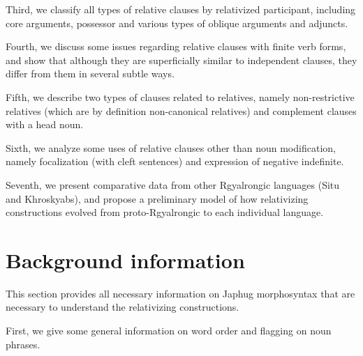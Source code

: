 \documentclass[oldfontcommands,oneside,a4paper,11pt]{article}
\begin{document}
Third, we classify all types of relative clauses by relativized participant, including core arguments, possessor and various types of oblique arguments and adjuncts.

Fourth, we discuss some issues regarding relative clauses with finite verb forms, and show that although they are superficially similar to independent clauses, they differ from them in several subtle ways.

Fifth, we describe two types of clauses related to relatives, namely non-restrictive relatives (which are by definition non-canonical relatives) and complement clauses with a head noun.

Sixth, we analyze some uses of relative clauses other than noun modification, namely focalization (with cleft sentences) and expression of negative indefinite.

Seventh, we  present comparative data from other Rgyalrongic languages (Situ and Khroskyabs), and propose a preliminary model of how relativizing constructions evolved from proto-Rgyalrongic to each individual language.


  


\section{Background information}
This section provides all necessary information on Japhug morphosyntax that are necessary to understand the relativizing constructions. 

First, we give some general information on word order and flagging on noun phrases.
\end{document}
